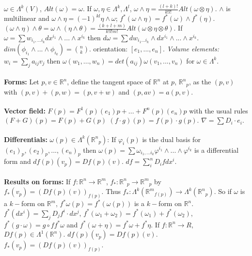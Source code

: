 $\omega \in \Lambda^k(V)$, $Alt( \omega) = \omega$.
If $\omega, \eta \in \Lambda^k , \Lambda^l$, $\omega \wedge \eta =
{\frac {(l+k)!} {k! l!}} Alt( \omega \otimes \eta )$. $\wedge$ is multilinear and
$\omega \wedge \eta= (-1)^{kl} \eta \wedge \omega$; $f^*(\omega \wedge \eta) =
f^*(\omega) \wedge f^*(\eta)$. 
$
(\omega \wedge \eta ) \wedge \theta =
\omega \wedge (\eta \wedge \theta)=
{\frac {(k+l+m)} {k!l!m!}} Alt(\omega \otimes \eta \otimes \theta)$.
If $\omega = \sum  w_{{i_1} , ... {i_k}} dx^{i_1} \wedge ... \wedge x^{i_k}$ then
$d \omega = \sum dw_{{i_1}  ... {i_k}} \wedge dx^{i_1} \wedge ... \wedge x^{i_k}$.
$dim(\phi_{i_1} \wedge ... \wedge \phi_{i_k}) = {n \choose k}$.
orientation: $[e_1 , ... , e_n]$.
\emph{Volume elements:}
$w_i= \sum_j a_{ij} v_j$ then $\omega (w_1 ,..., w_n)= det(a_{ij})
\omega (v_1 , ... , v_n )$ for $\omega \in \Lambda^k$.
\\
\\
{\bf Forms:} Let $p, v \in {\mathbb R}^n$, define the tangent space of ${\mathbb R}^n$ 
at $p$, ${{\mathbb R}^n}_p$, as the $(p,v)$ with 
$(p,v)+(p,w)= (p, v+w)$ and $(p,av)= a(p, v)$.
\\
\\
{\bf Vector field:}
$F(p)= F^1 (p) (e_1)p + ... + F^n (p) (e_n)p$ with the usual rules $(F+G)(p)= F(p)+G(p)$
$(f \cdot g)(p)= f(p) \cdot g(p)$. $\nabla= \sum D_i \cdot e_i$.
\\
\\
{\bf Differentials:}
$\omega(p) \in \Lambda^k ({{\mathbb R}^n}_p)$:  If $\varphi_i(p)$ is the dual basis for
$(e_1)_p , (e_2)_p , ..., (e_n)_p$ then
$\omega (p) = \sum
\omega_{{i_1} , ... {i_k}} \varphi^{i_1} \wedge ... \wedge \varphi^{i_k}$ is
a differential form and $df(p)(v_p)=Df(p) (v)$. $df= \sum_i^n D_i f dx^i$.
\\
\\
{\bf Results on forms:} If 
$f: {\mathbb R}^n \rightarrow {\mathbb R}^m$,
$f_*: {{\mathbb R}^n}_p \rightarrow {{\mathbb R}^m}_p$ by
$f_* (v_p)= (Df(p)(v))_{f(p)}$.  
Thus $f_*: \Lambda^k({{\mathbb R}^m}_{f(p)}) \rightarrow \Lambda^k({{\mathbb R}^n}_p)$.  So if
$\omega$ is a $k-$form on ${\mathbb R}^m$, $f^* \omega (p) = f^*(\omega(p))$ is a $k-$form on ${\mathbb R}^n$.
$f^* (dx^i) = \sum_j D_j f^i \cdot dx^j$, 
$f^* (\omega_1 + \omega_2 )= f^* (\omega_1 ) + f^*(\omega_2 )$, 
$f^* (g \cdot \omega)= g \circ f f^* \omega$ and
$f^* (\omega + \eta )= f^* \omega + f^* \eta$.
If $f: {\mathbb R}^n \rightarrow R$, $Df(p) \in \Lambda^1 ({\mathbb R}^n)$.
$df(p) (v_p )= Df(p)(v)$.  $f_* (v_p )= (Df(p)(v))_{f(p)}$.
